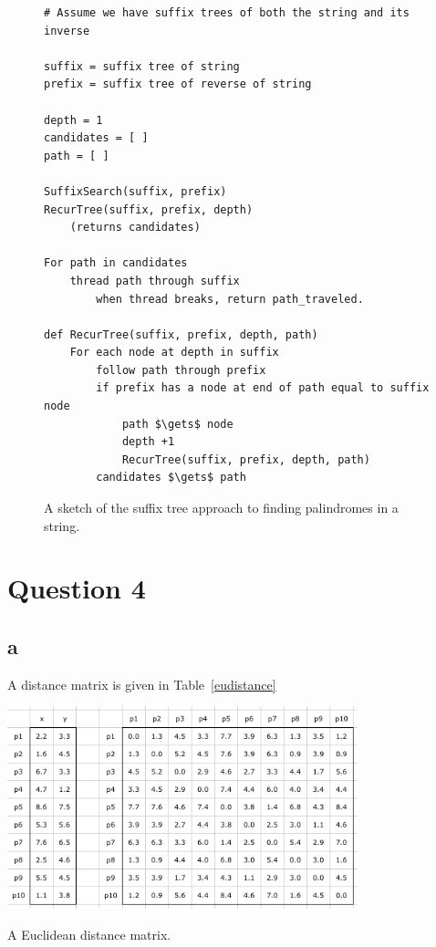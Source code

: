 \documentclass[12pt]{article}
\begin{document}
\begin{figure}[h]
\begin{framed}
\begin{lstlisting}
# Assume we have suffix trees of both the string and its inverse

suffix = suffix tree of string
prefix = suffix tree of reverse of string

depth = 1
candidates = [ ]
path = [ ]

SuffixSearch(suffix, prefix)
RecurTree(suffix, prefix, depth)
	(returns candidates)
	
For path in candidates
	thread path through suffix
		when thread breaks, return path_traveled.

def RecurTree(suffix, prefix, depth, path)
	For each node at depth in suffix
		follow path through prefix
		if prefix has a node at end of path equal to suffix node
			path $\gets$ node
			depth +1
			RecurTree(suffix, prefix, depth, path)
		candidates $\gets$ path
\end{lstlisting}
\end{framed}
\caption{A sketch of the suffix tree approach to finding palindromes in a string.}
\label{suffindrome}
\end{figure}


\clearpage
\section*{Question 4}
\subsection*{a} A distance matrix is given in Table~\ref{eudistance}
\begin{table}
\centering
\includegraphics[width=4in]{eudistance.jpg}
\caption{A Euclidean distance matrix.}
\label{eudistance}
\end{table}
\end{document}
